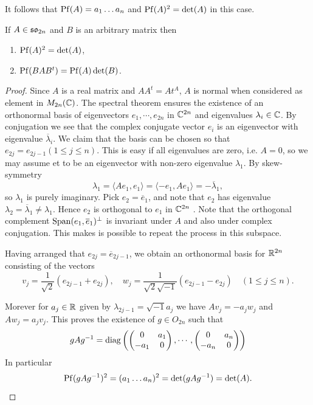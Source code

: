 It follows that $\mathrm{Pf}(A) = a_1\ldots a_n$ and $\mathrm{Pf}(A)^2 = \det(A)$ in this case.


\begin{theorem}\label{theorem:B.5}
  If $A\in\mathfrak{so}_{2n}$ and $B$ is an arbitrary matrix then 
  \begin{enumerate}
    \item $\mathrm{Pf}(A)^2 = \det(A)$,
    \item $\mathrm{Pf}(BAB^t) = \mathrm{Pf}(A)\det(B)$.
  \end{enumerate}
\end{theorem}

\begin{proof}
  Since $A$ is a real matrix and $AA^t = At^A$, $A$ is normal when considered as
element in $M_{2n}({\mathbb{C}})$. The spectral theorem ensures the existence of an orthonormal
basis of eigenvectors $e_1,\cdots,e_{2n}$ in ${\mathbb{C}}^{2n}$ and eigenvalues $\lambda_i\in{\ensuremath{\mathbb{C}}}$.
By conjugation we see that the complex conjugate vector $e_i$ is an eigenvector
with eigenvalue $\overline{\lambda}_i$. We claim that the basis can be chosen so that $e_{2j} = e_{2j-1} (1\le j\le n)$. 
This is easy if all eigenvalues are zero, i.e. $A = 0$, so we may assume et to be an eigenvector with 
non-zero eigenvalue $\lambda_1$. By skew-symmetry
\[
  \lambda_1 = \langle Ae_1, e_1\rangle 
  = \langle -e_1, Ae_1\rangle
  = -\overline{\lambda}_1,
\]
so $\lambda_1$ is purely imaginary. Pick $e_2 = \overline{e}_1$, and note that $e_2$ 
has eigenvalue $\lambda_2=\overline{\lambda}_1\neq \lambda_1$. Hence $e_2$ is orthogonal to $e_1$ 
in ${\mathbb{C}}^{2n}$ . Note that the orthogonal complement $\mathrm{Span}(e_1, \overline{e}_1)^\perp$ is invariant 
under $A$ and also under complex conjugation. This makes is possible to repeat the process in this subspace.


Having arranged that $e_{2j} = \overline{e}_{2j-1}$, we obtain an orthonormal basis for ${\mathbb{R}}^{2n}$ consisting of the vectors
\[
  v_j = \frac{1}{\sqrt{2}}(e_{2j-1} + e_{2j}), \quad 
  w_j = \frac{1}{\sqrt{2}\sqrt{-1}} (e_{2j-1} - e_{2j})\quad (1\le j \le n).
\]

Morever for $a_j\in{\ensuremath{\mathbb{R}}}$ given by $\lambda_{2j-1}=\sqrt{-1}a_j$ we have $Av_j = -a_jw_j$ and 
$Aw_j = a_jv_j$. This proves the existence of $g\in O_{2n}$ such that 
\[
  gAg^{-1} = \operatorname{diag}\left(
    \begin{pmatrix}
      0 & a_1 \\
      -a_1 & 0
    \end{pmatrix},
    \cdots, 
    \begin{pmatrix}
      0 & a_n \\
      -a_n & 0
    \end{pmatrix}
  \right)
\]
In particular 
\[
    \mathrm{Pf}(gAg^{-1})^2 = (a_1\ldots a_n)^2
    = \det(gAg^{-1}) = \det(A).
\]


\end{proof}
